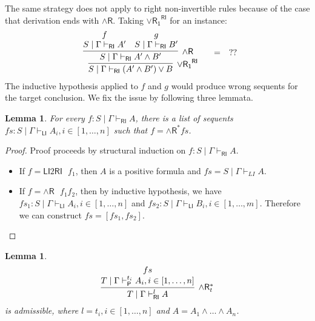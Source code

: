 \documentclass[submission,copyright,creativecommons]{eptcs}
\newtheorem{lemma}[theorem]{Lemma}
\theoremstyle{definition}
\newcommand{\andr}{\land \mathsf{R}}
\newcommand{\orrone}{\lor \mathsf{R_{1}}}
\newcommand{\RI}{\mathsf{RI}}
\newcommand{\LI}{\mathsf{LI}}
\newcommand{\Pass}{\mathsf{P}}
\newcommand{\proofbox}[1]{\begin{tabular}{l} #1 \end{tabular}}
\begin{document}
The same strategy does not apply to right non-invertible rules because of the case that derivation ends with $\andr$.
Taking $\orrone^{\RI}$ for an instance:
\begin{displaymath}
  \begin{array}{c}
    \proofbox{
    \infer[\orrone^{\RI}]{S \mid \Gamma \vdash_{\RI} (A' \land B') \lor B}{
      \infer[\andr]{S \mid \Gamma \vdash_{\RI} A' \land B'}{
        \deduce{S \mid \Gamma \vdash_{\RI} A'}{f}
        &
        \deduce{S \mid \Gamma \vdash_{\RI} B'}{g}
      }
    }
    }
    \quad
    =
    \quad
    ??
  \end{array}
\end{displaymath}
The inductive hypothesis applied to $f$ and $g$ would produce wrong sequents for the target conclusion.
We fix the issue by following three lemmata.
\begin{lemma}
  For every $f : S \mid \Gamma \vdash_{\RI} A$, there is a list of sequents $fs : S \mid \Gamma \vdash_{\LI} A_i, i \in [1 , \dots , n]$ such that $f = \andr^{*} fs$.
\end{lemma}
\begin{proof}
  Proof proceeds by structural induction on $f : S \mid \Gamma \vdash_{\RI} A$.
  \begin{itemize}
    \item If $f = \LI2 \RI \text{ } f_1$, then $A$ is a positive formula and $fs = S \mid \Gamma \vdash_{LI} A$.
    \item If $f = \andr \text{ } f_1 f_2$, then by inductive hypothesis, we have $fs_1 : S \mid \Gamma \vdash_{\LI} A_i, i \in [1 , \dots , n]$ and $fs_2 : S \mid \Gamma \vdash_{\LI} B_i, i \in [1 , \dots , m]$.
    Therefore we can construct $fs = [fs_1 , fs_2]$.
  \end{itemize}
\end{proof}
\begin{lemma}
  \begin{displaymath}
    \infer[\andr^{*}_t]{T \mid \Gamma \vdash^{l}_{\RI} A}{
      \deduce{T \mid \Gamma \vdash^{t_i}_{\Pass} A_i , i \in [1 , \dots , n]}{fs}
    }
  \end{displaymath}
  is admissible, where $l = t_i , i \in [1 , \dots , n]$ and $A = A_1 \land \dots \land A_n$.
\end{lemma}
\end{document}

